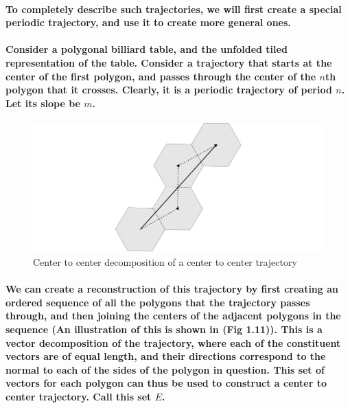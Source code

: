 \documentclass{report}
\begin{document}
\paragraph{To completely describe such trajectories, we will first create a special periodic trajectory, and use it to create more general ones.}

\paragraph{Consider a polygonal billiard table, and the unfolded tiled representation of the table. Consider a trajectory that starts at the center of the first polygon, and passes through the center of the $n$th polygon that it crosses. Clearly, it is a periodic trajectory of period $n$. Let its slope be $m$.}

\begin{figure} 
\begin{center}
\includegraphics[scale=0.3]{11}
\caption{Center to center decomposition of a center to center trajectory}
\end{center}
\end{figure}

\paragraph{We can create a reconstruction of this trajectory by first creating an ordered sequence of all the polygons that the trajectory passes through, and then joining the centers of the adjacent polygons in the sequence (An illustration of this is shown in (Fig 1.11)). \pagebreak This is a vector decomposition of the trajectory, where each of the constituent vectors are of equal length, and their directions correspond to the normal to each of the sides of the polygon in question. This set of vectors for each polygon can thus be used to construct a center to center trajectory. Call this set $E$.}
\end{document}
